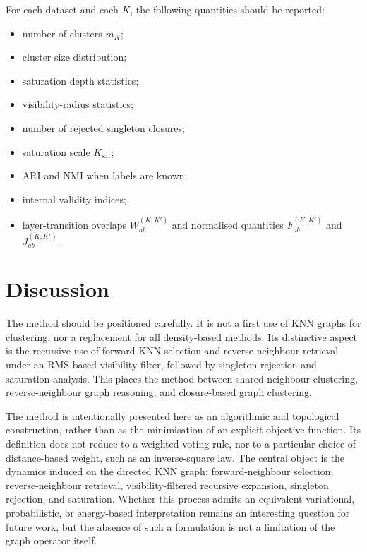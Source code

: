 \documentclass[pdflatex,sn-mathphys-num]{sn-jnl}
\begin{document}
For each dataset and each $K$, the following quantities should be reported:
\begin{itemize}
    \item number of clusters $m_K$;
    \item cluster size distribution;
    \item saturation depth statistics;
    \item visibility-radius statistics;
    \item number of rejected singleton closures;
    \item saturation scale $K_{\mathrm{sat}}$;
    \item ARI and NMI when labels are known;
    \item internal validity indices;
    \item layer-transition overlaps $W_{ab}^{(K,K')}$ and normalised quantities $F_{ab}^{(K,K')}$ and $J_{ab}^{(K,K')}$.
\end{itemize}

\section{Discussion}\label{sec:discussion}

The method should be positioned carefully. It is not a first use of KNN graphs for clustering, nor a replacement for all density-based methods. Its distinctive aspect is the recursive use of forward KNN selection and reverse-neighbour retrieval under an RMS-based visibility filter, followed by singleton rejection and saturation analysis. This places the method between shared-neighbour clustering, reverse-neighbour graph reasoning, and closure-based graph clustering.

The method is intentionally presented here as an algorithmic and topological construction, rather than as the minimisation of an explicit objective function. Its definition does not reduce to a weighted voting rule, nor to a particular choice of distance-based weight, such as an inverse-square law. The central object is the dynamics induced on the directed KNN graph: forward-neighbour selection, reverse-neighbour retrieval, visibility-filtered recursive expansion, singleton rejection, and saturation. Whether this process admits an equivalent variational, probabilistic, or energy-based interpretation remains an interesting question for future work, but the absence of such a formulation is not a limitation of the graph operator itself.
\end{document}
